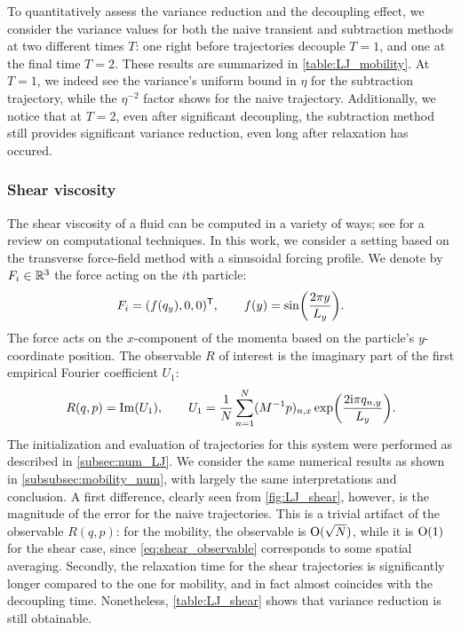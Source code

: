 To quantitatively assess the variance reduction and the decoupling effect, we consider the variance values for both the naive transient and subtraction methods at two different times $T$: one right before trajectories decouple $T=1$, and one at the final time $T=2$. These results are summarized in \cref{table:LJ_mobility}. At $T=1$, we indeed see the variance's uniform bound in $\eta$ for the subtraction trajectory, while the $\eta^{-2}$ factor shows for the naive trajectory. Additionally, we notice that at $T=2$, even after significant decoupling, the subtraction method still provides significant variance reduction, even long after relaxation has occured.

\subsubsection{Shear viscosity}
\label{subsubsec:shear}
%
The shear viscosity of a fluid can be computed in a variety of ways; see \cite{todd2007} for a review on computational techniques. In this work, we consider a setting based on the transverse force-field method \cite{joubaud2012} with a sinusoidal forcing profile. We denote by $F_i\in\mathbb{R}^3$ the force acting on the $i$th particle:
%
\begin{equation}
    F_i = (f(q_y), 0, 0)^\t, \qquad  f(y) = \sin\paren*{\frac{2\pi y}{L_y}}.
\end{equation}
%
The force acts on the $x$-component of the momenta based on the particle's $y$-coordinate position.
%
%
%
The observable $R$ of interest is the imaginary part of the first empirical Fourier coefficient $U_1$:
%
\begin{equation}
    R(q,p) = \Im(U_1), \qquad U_1 = \frac{1}{N}\sum_{n=1}^N (M^{-1}p)_{n,x}\exp\paren*{\frac{2\mathrm{i}\pi q_{n,y}}{L_y}}.
    \label{eq:shear_observable}
\end{equation}
%
The initialization and evaluation of trajectories for this system were performed as described in \cref{subsec:num_LJ}. We consider the same numerical results as shown in \cref{subsubsec:mobility_num}, with largely the same interpretations and conclusion. A first difference, clearly seen from \cref{fig:LJ_shear}, however, is the magnitude of the error for the naive trajectories. This is a trivial artifact of the observable $R(q,p)$: for the mobility, the observable is $\mathrm{O}(\sqrt{N})$, while it is $\mathrm{O}(1)$ for the shear case, since \eqref{eq:shear_observable} corresponds to some spatial averaging. Secondly, the relaxation time for the shear trajectories is significantly longer compared to the one for mobility, and in fact almost coincides with the decoupling time. Nonetheless, \cref{table:LJ_shear} shows that variance reduction is still obtainable.
%

